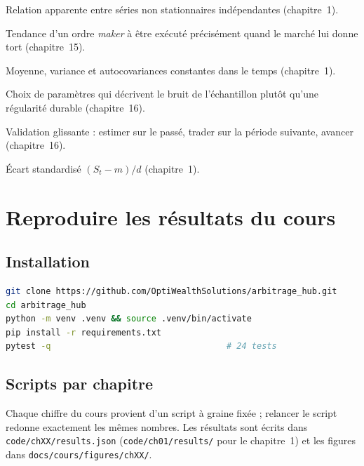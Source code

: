 \begin{description}[leftmargin=0pt,itemsep=0.3em]
\item[Régression fallacieuse.] Relation apparente entre séries non stationnaires indépendantes (chapitre~1).
\item[Sélection adverse.] Tendance d'un ordre \emph{maker} à être exécuté précisément quand le marché lui donne tort (chapitre~15).
\item[Stationnarité.] Moyenne, variance et autocovariances constantes dans le temps (chapitre~1).
\item[Surapprentissage.] Choix de paramètres qui décrivent le bruit de l'échantillon plutôt qu'une régularité durable (chapitre~16).
\item[\emph{Walk-forward}.] Validation glissante : estimer sur le passé, trader sur la période suivante, avancer (chapitre~16).
\item[\emph{Z-score}.] Écart standardisé $(S_t - m)/d$ (chapitre~1).
\end{description}

\chapter{Reproduire les résultats du cours}
\label{ann:repro}

\section*{Installation}
\begin{lstlisting}[language=bash]
git clone https://github.com/OptiWealthSolutions/arbitrage_hub.git
cd arbitrage_hub
python -m venv .venv && source .venv/bin/activate
pip install -r requirements.txt
pytest -q                                   # 24 tests
\end{lstlisting}

\section*{Scripts par chapitre}

Chaque chiffre du cours provient d'un script à graine fixée ; relancer le script redonne exactement les mêmes nombres. Les résultats sont écrits dans \texttt{code/chXX/results.json} (\texttt{code/ch01/results/} pour le chapitre~1) et les figures dans \texttt{docs/cours/figures/chXX/}.

